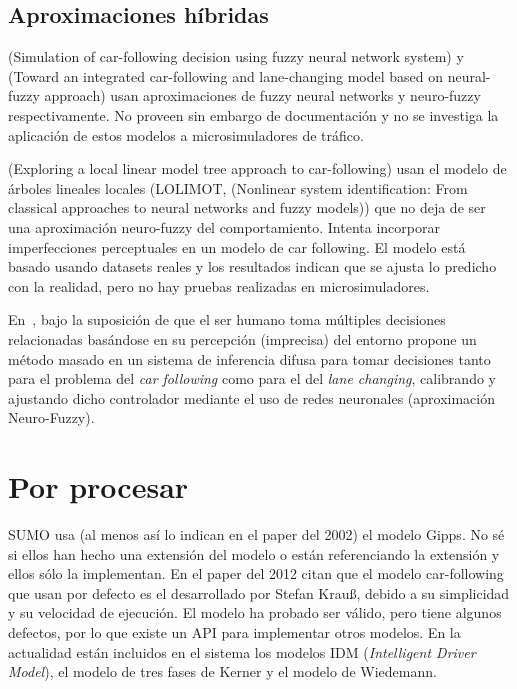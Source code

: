 \subsection{Aproximaciones híbridas}

(Simulation of car-following decision using fuzzy neural network system) y (Toward an integrated car-following and lane-changing model based on neural-fuzzy approach) usan aproximaciones de fuzzy neural networks y neuro-fuzzy respectivamente. No proveen sin embargo de documentación y no se investiga la aplicación de estos modelos a microsimuladores de tráfico.

(Exploring a local linear model tree approach to car-following) usan el modelo de árboles lineales locales (LOLIMOT, (Nonlinear system identification: From classical approaches to neural networks and fuzzy models)) que no deja de ser una aproximación neuro-fuzzy del comportamiento. Intenta incorporar imperfecciones perceptuales en un modelo de car following. El modelo está basado usando datasets reales y los resultados indican que se ajusta lo predicho con la realidad, pero no hay pruebas realizadas en microsimuladores.

En~\cite{Ma2004}, bajo la suposición de que el ser humano toma múltiples decisiones relacionadas basándose en su percepción (imprecisa) del entorno propone un método masado en un sistema de inferencia difusa para tomar decisiones tanto para el problema del \textit{car following} como para el del \textit{lane changing}, calibrando y ajustando dicho controlador mediante el uso de redes neuronales (aproximación Neuro-Fuzzy).

\section{Por procesar}

SUMO usa (al menos así lo indican en el paper del 2002) el modelo Gipps\cite{krajzewicz2002sumo}. No sé si ellos han hecho una extensión del modelo o están referenciando la extensión y ellos sólo la implementan. En el paper del 2012 citan que el modelo car-following que usan por defecto es el desarrollado por Stefan Krauß\cite{jin2016evaluation}, debido a su simplicidad y su velocidad de ejecución. El modelo ha probado ser válido, pero tiene algunos defectos, por lo que existe un API para implementar otros modelos. En la actualidad están incluidos en el sistema los modelos IDM\cite{treiber2000congested} (\textit{Intelligent Driver Model}), el modelo de tres fases de Kerner\cite{kerner2008testbed} y el modelo de Wiedemann\cite{wiedemann1974simulation}.

